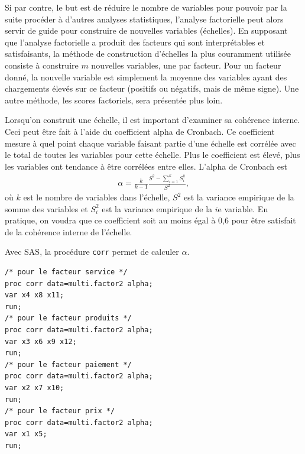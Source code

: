 \documentclass[
]{book}
\theoremstyle{definition}
\theoremstyle{definition}
\theoremstyle{definition}
\theoremstyle{remark}
\begin{document}
Si par contre, le but est de réduire le nombre de variables pour pouvoir par la suite procéder à d'autres analyses statistiques, l'analyse factorielle peut alors servir de guide pour construire de nouvelles variables (échelles). En supposant que l'analyse factorielle a produit des facteurs qui sont interprétables et satisfaisants, la méthode de construction d'échelles la plus couramment utilisée consiste à construire \(m\) nouvelles variables, une par facteur. Pour un facteur donné, la nouvelle variable est simplement la moyenne des variables ayant des chargements élevés sur ce facteur (positifs ou négatifs, mais de même signe). Une autre méthode, les scores factoriels, sera présentée plus loin.

Lorsqu'on construit une échelle, il est important d'examiner sa cohérence interne. Ceci peut être fait à l'aide du coefficient alpha de Cronbach. Ce coefficient mesure à quel point chaque variable faisant partie d'une échelle est corrélée avec le total de toutes les variables pour cette échelle.
Plus le coefficient est élevé, plus les variables ont tendance à être corrélées entre elles. L'alpha de Cronbach est
\begin{align*}
\alpha=\frac{k}{k-1} \frac{S^2-\sum_{i=1}^k S_i^k}{S^2},
\end{align*}
où \(k\) est le nombre de variables dans l'échelle, \(S^2\) est la variance empirique de la somme des variables et \(S_i^2\) est la variance empirique de la \(i\)e variable. En pratique, on voudra que ce coefficient soit au moins égal à 0,6 pour être satisfait de la cohérence interne de l'échelle.

Avec \textsf{SAS}, la procédure \texttt{corr} permet de calculer \(\alpha\).

\begin{verbatim}
/* pour le facteur service */
proc corr data=multi.factor2 alpha;
var x4 x8 x11;
run;
/* pour le facteur produits */
proc corr data=multi.factor2 alpha;
var x3 x6 x9 x12;
run;
/* pour le facteur paiement */
proc corr data=multi.factor2 alpha;
var x2 x7 x10;
run;
/* pour le facteur prix */
proc corr data=multi.factor2 alpha;
var x1 x5;
run;
\end{verbatim}
\end{document}

